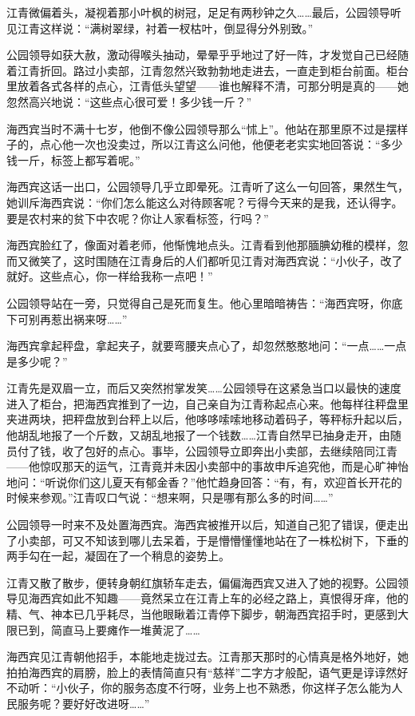 \par 江青微偏着头，凝视着那小叶枫的树冠，足足有两秒钟之久……最后，公园领导听见江青这样说：“满树翠绿，衬着一杈枯叶，倒显得分外别致。”
\par 公园领导如获大赦，激动得喉头抽动，晕晕乎乎地过了好一阵，才发觉自己已经随着江青折回。路过小卖部，江青忽然兴致勃勃地走进去，一直走到柜台前面。柜台里放着各式各样的点心，江青低头望望——谁也解释不清，可那分明是真的——她忽然高兴地说：“这些点心很可爱！多少钱一斤？”
\par 海西宾当时不满十七岁，他倒不像公园领导那么“怵上”。他站在那里原不过是摆样子的，点心他一次也没卖过，所以江青这么问他，他便老老实实地回答说：“多少钱一斤，标签上都写着呢。”
\par 海西宾这话一出口，公园领导几乎立即晕死。江青听了这么一句回答，果然生气，她训斥海西宾说：“你们怎么能这么对待顾客呢？亏得今天来的是我，还认得字。要是农村来的贫下中农呢？你让人家看标签，行吗？”
\par 海西宾脸红了，像面对着老师，他惭愧地点头。江青看到他那腼腆幼稚的模样，忽而又微笑了，这时围随在江青身后的人们都听见江青对海西宾说：“小伙子，改了就好。这些点心，你一样给我称一点吧！”
\par 公园领导站在一旁，只觉得自己是死而复生。他心里暗暗祷告：“海西宾呀，你底下可别再惹出祸来呀……”
\par 海西宾拿起秤盘，拿起夹子，就要弯腰夹点心了，却忽然憨憨地问：“一点……一点是多少呢？”
\par 江青先是双眉一立，而后又突然拊掌发笑……公园领导在这紧急当口以最快的速度进入了柜台，把海西宾推到了一边，自己亲自为江青称起点心来。他每样往秤盘里夹进两块，把秤盘放到台秤上以后，他哆哆嗦嗦地移动着码子，等秤标升起以后，他胡乱地报了一个斤数，又胡乱地报了一个钱数……江青自然早已抽身走开，由随员付了钱，收了包好的点心。事毕，公园领导立即奔出小卖部，去继续陪同江青——他惊叹那天的运气，江青竟并未因小卖部中的事故申斥追究他，而是心旷神怡地问：“听说你们这儿夏天有郁金香？”他忙趋身回答：“有，有，欢迎首长开花的时候来参观。”江青叹口气说：“想来啊，只是哪有那么多的时间……”
\par 公园领导一时来不及处置海西宾。海西宾被推开以后，知道自己犯了错误，便走出了小卖部，可又不知该到哪儿去呆着，于是懵懵懂懂地站在了一株松树下，下垂的两手勾在一起，凝固在了一个稍息的姿势上。
\par 江青又散了散步，便转身朝红旗轿车走去，偏偏海西宾又进入了她的视野。公园领导见海西宾如此不知趣——竟然呆立在江青上车的必经之路上，真恨得牙痒，他的精、气、神本已几乎耗尽，当他眼瞅着江青停下脚步，朝海西宾招手时，更感到大限已到，简直马上要瘫作一堆黄泥了……
\par 海西宾见江青朝他招手，本能地走拢过去。江青那天那时的心情真是格外地好，她拍拍海西宾的肩膀，脸上的表情简直只有“慈祥”二字方才般配，语气更是谆谆然好不动听：“小伙子，你的服务态度不行呀，业务上也不熟悉，你这样子怎么能为人民服务呢？要好好改进呀……”
